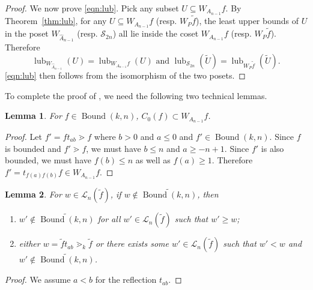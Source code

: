\documentclass[12pt,reqno]{amsart}
\newtheorem{lemma}{Lemma}[section]
\theoremstyle{definition}
\newcommand{\symm}{\mathcal{S}}
\newcommand{\bound}{\operatorname{Bound}}
\newcommand{\lub}{\operatorname{lub}}
\begin{document}
{\begin{proof}
We now prove \eqref{eqn:lub}. Pick any subset $U\subseteq W_{A_{n-1}}f$. 
By Theorem~\ref{thm:lub}, for any $U\subseteq W_{A_{n-1}}f$ (resp. $W_P \tilde{f}$), the least upper bounds of $U$ in the poset $W_{\widehat{A}_{n-1}}$ (resp. $\symm_{2n}$) all lie inside the coset $W_{A_{n-1}}f$ (resp. $W_P \tilde{f}$). Therefore 
\[\lub_{W_{\widehat{A}_{n-1}}}(U) = \lub_{W_{A_{n-1}}f}(U)\text{ and }\lub_{\symm_{2n}}(\widetilde U) = \lub_{W_P\widetilde{f}}(\widetilde U).\]
\eqref{eqn:lub} then follows from the isomorphism of the two posets.
\end{proof}

To complete the proof of , we need the following two technical lemmas.
\begin{lemma}
    \label{lem:Cf-in-coset}
      For $f\in \bound(k,n)$, $C_0(f)\subset W_{A_{n-1}}f$.
\end{lemma}
\begin{proof}
    Let $f'=ft_{ab}\gtrdot f$ where $b>0$ and $a\le 0$ and $f'\in \bound(k,n)$. Since $f$ is bounded and $f'\gtrdot f$, we must have $b\le n$ and $a\ge -n+1$. Since $f'$ is also bounded, we must have $f(b)\le n$ as well as $f(a)\ge 1$. Therefore $f'=t_{f(a)f(b)}f\in W_{A_{n-1}}f$. 
\end{proof}

\begin{lemma}\label{lemma:bounded}
     For $w\in \mathcal{L}_n(\widetilde{f})$, if $w\notin \widetilde{\bound(k,n)}$, then 
     \begin{enumerate}
         \item $w'\notin\widetilde{\bound(k,n)}$ for all $w'\in \mathcal{L}_n(\widetilde{f})$ such that $w'\geq w$;
         \item either $w = \widetilde{f}t_{ab}\gtrdot_k \widetilde{f}$ or there exists some $w'\in \mathcal{L}_{n}(\widetilde{f})$ such that $w'< w$ and $w'\notin\widetilde{\bound(k,n)}$.
     \end{enumerate}
\end{lemma}
\begin{proof}
    We assume $a<b$ for the reflection $t_{ab}$. 
    

\end{proof}}
\end{document}
